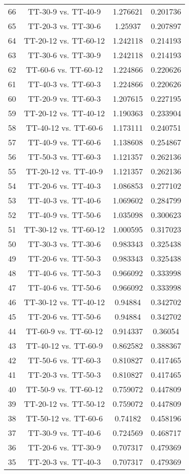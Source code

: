 \documentclass[a4paper,10pt]{article}
\begin{document}
\begin{landscape}
\begin{table}[!htp]
\begin{tabular}{cccc}
66&TT-30-9 vs. TT-40-9&1.276621&0.201736\\
65&TT-20-3 vs. TT-30-6&1.25937&0.207897\\
64&TT-20-12 vs. TT-60-12&1.242118&0.214193\\
63&TT-30-6 vs. TT-30-9&1.242118&0.214193\\
62&TT-60-6 vs. TT-60-12&1.224866&0.220626\\
61&TT-40-3 vs. TT-60-3&1.224866&0.220626\\
60&TT-20-9 vs. TT-60-3&1.207615&0.227195\\
59&TT-20-12 vs. TT-40-12&1.190363&0.233904\\
58&TT-40-12 vs. TT-60-6&1.173111&0.240751\\
57&TT-40-9 vs. TT-60-6&1.138608&0.254867\\
56&TT-50-3 vs. TT-60-3&1.121357&0.262136\\
55&TT-20-12 vs. TT-40-9&1.121357&0.262136\\
54&TT-20-6 vs. TT-40-3&1.086853&0.277102\\
53&TT-40-3 vs. TT-40-6&1.069602&0.284799\\
52&TT-40-9 vs. TT-50-6&1.035098&0.300623\\
51&TT-30-12 vs. TT-60-12&1.000595&0.317023\\
50&TT-30-3 vs. TT-30-6&0.983343&0.325438\\
49&TT-20-6 vs. TT-50-3&0.983343&0.325438\\
48&TT-40-6 vs. TT-50-3&0.966092&0.333998\\
47&TT-40-6 vs. TT-50-6&0.966092&0.333998\\
46&TT-30-12 vs. TT-40-12&0.94884&0.342702\\
45&TT-20-6 vs. TT-50-6&0.94884&0.342702\\
44&TT-60-9 vs. TT-60-12&0.914337&0.36054\\
43&TT-40-12 vs. TT-60-9&0.862582&0.388367\\
42&TT-50-6 vs. TT-60-3&0.810827&0.417465\\
41&TT-20-3 vs. TT-50-3&0.810827&0.417465\\
40&TT-50-9 vs. TT-60-12&0.759072&0.447809\\
39&TT-20-12 vs. TT-50-12&0.759072&0.447809\\
38&TT-50-12 vs. TT-60-6&0.74182&0.458196\\
37&TT-30-9 vs. TT-40-6&0.724569&0.468717\\
36&TT-20-6 vs. TT-30-9&0.707317&0.479369\\
35&TT-20-3 vs. TT-40-3&0.707317&0.479369\\

\end{tabular}
\end{table}
\end{landscape}
\end{document}

